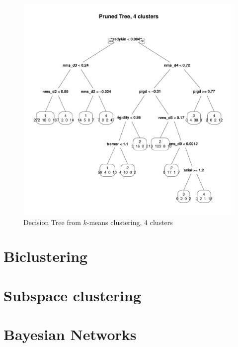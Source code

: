 \documentclass[letterpaper,12pt]{article}
\begin{document}
\begin{figure}[ht]
  \centering
  \includegraphics[width=0.8\linewidth]{dtree-kmeans-pruned-4.pdf}
  \caption{Decision Tree from $k$-means clustering, 4 clusters}
  \label{fig:kmeans-dtree-4}
\end{figure}


\section{Biclustering}

\section{Subspace clustering}


\section{Bayesian Networks}
\end{document}
